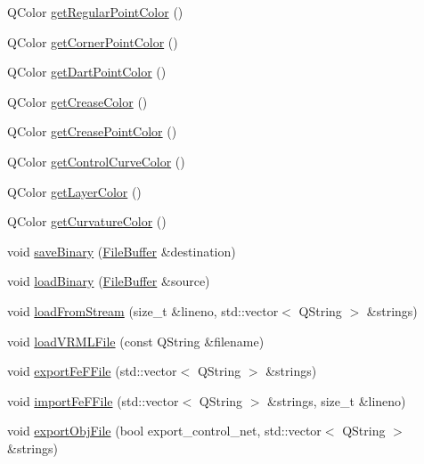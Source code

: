 \begin{DoxyCompactItemize}
Q\-Color \hyperlink{classShipCAD_1_1SubdivisionSurface_afdf406376421eb43a34f53392fbcf5b1}{get\-Regular\-Point\-Color} ()
\item 
Q\-Color \hyperlink{classShipCAD_1_1SubdivisionSurface_af64e951c070d6c88f70c399bc13809d1}{get\-Corner\-Point\-Color} ()
\item 
Q\-Color \hyperlink{classShipCAD_1_1SubdivisionSurface_ac355dfe572889755c24d1c8cd3145aea}{get\-Dart\-Point\-Color} ()
\item 
Q\-Color \hyperlink{classShipCAD_1_1SubdivisionSurface_a6aad1f3725f8033bb85403a01c252006}{get\-Crease\-Color} ()
\item 
Q\-Color \hyperlink{classShipCAD_1_1SubdivisionSurface_a82c8cb1c6c448be7554bcb42e0099660}{get\-Crease\-Point\-Color} ()
\item 
Q\-Color \hyperlink{classShipCAD_1_1SubdivisionSurface_a5b35353f739d224d8aa40ff19333ba98}{get\-Control\-Curve\-Color} ()
\item 
Q\-Color \hyperlink{classShipCAD_1_1SubdivisionSurface_a2a5e9c50d43e72829e02a8c0be31c260}{get\-Layer\-Color} ()
\item 
Q\-Color \hyperlink{classShipCAD_1_1SubdivisionSurface_aa39747141685b52d3987cf6c9f4e2aa8}{get\-Curvature\-Color} ()
\item 
void \hyperlink{classShipCAD_1_1SubdivisionSurface_a6e6254ecc6fcbdadf1ff4f646caa1d59}{save\-Binary} (\hyperlink{classShipCAD_1_1FileBuffer}{File\-Buffer} \&destination)
\item 
void \hyperlink{classShipCAD_1_1SubdivisionSurface_ac8ad644e0c19ac180fd4a7368fa410a6}{load\-Binary} (\hyperlink{classShipCAD_1_1FileBuffer}{File\-Buffer} \&source)
\item 
void \hyperlink{classShipCAD_1_1SubdivisionSurface_a489eed6508bb376170fa7926d2b7dc10}{load\-From\-Stream} (size\-\_\-t \&lineno, std\-::vector$<$ Q\-String $>$ \&strings)
\item 
void \hyperlink{classShipCAD_1_1SubdivisionSurface_add8d612c82f170869f81042520f62499}{load\-V\-R\-M\-L\-File} (const Q\-String \&filename)
\item 
void \hyperlink{classShipCAD_1_1SubdivisionSurface_a958a2af5d8d06ccf1aa3ac4e812cb1be}{export\-Fe\-F\-File} (std\-::vector$<$ Q\-String $>$ \&strings)
\item 
void \hyperlink{classShipCAD_1_1SubdivisionSurface_af5e99c578032b83916f5c06591cbf459}{import\-Fe\-F\-File} (std\-::vector$<$ Q\-String $>$ \&strings, size\-\_\-t \&lineno)
\item 
void \hyperlink{classShipCAD_1_1SubdivisionSurface_ac6a4c0542b17b1b50edb57ea5c0f28ec}{export\-Obj\-File} (bool export\-\_\-control\-\_\-net, std\-::vector$<$ Q\-String $>$ \&strings)

\end{DoxyCompactItemize}
